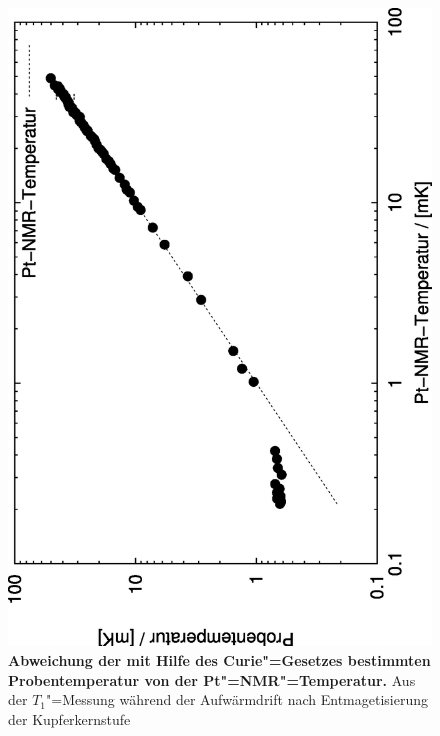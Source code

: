 \begin{figure}[htp]
	\begin{center}
		\includegraphics[angle=-90,width=\midwidth]{plots/t1_aug1197da_2}
	\end{center}
	\caption[Abweichung der mit Hilfe des Curie"=Gesetzes bestimmten
		Probentemperatur von der Pt"=NMR"=Temperatur]{{\upshape\bfseries Abweichung der mit Hilfe des Curie"=Gesetzes bestimmten
		Probentemperatur von der Pt"=NMR"=Temperatur.} Aus der $T_1$"=Messung während der
		Aufwärmdrift nach Entmagetisierung der Kupferkernstufe}
	\label{fig:sampletemp}
\end{figure}


